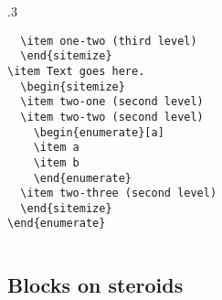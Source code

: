 \documentclass[8pt, utf8, a4paper, handout]{beamer}
\begin{document}
\begin{frame}[fragile]
\begin{columns}[t, onlytext]
\begin{column}{.3\hsize}
\begin{verbatim}
  \item one-two (third level)
  \end{sitemize}
\item Text goes here.
  \begin{sitemize}
  \item two-one (second level)
  \item two-two (second level)
    \begin{enumerate}[a]
    \item a
    \item b
    \end{enumerate}
  \item two-three (second level)
  \end{sitemize}
\end{enumerate}
      \end{verbatim}\egroup
    \end{column}\hfill
  \end{columns}

\end{frame}


\subsection{Blocks on steroids}
\end{document}
